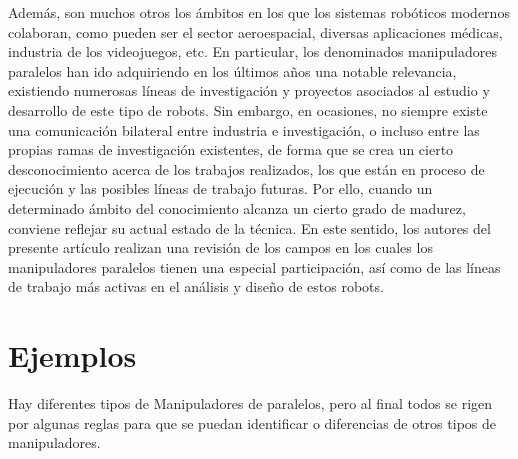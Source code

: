 \documentclass[11pt,a4paper,oldfontcommands,oneside]{memoir}
\begin{document}
Además, son muchos otros los ámbitos en los que los sistemas robóticos modernos colaboran, como pueden ser el sector aeroespacial, diversas aplicaciones médicas, industria de los videojuegos, etc. En particular, los denominados manipuladores paralelos han ido adquiriendo en los últimos años una notable relevancia, existiendo numerosas líneas de investigación y proyectos asociados al estudio y desarrollo de este tipo de robots. Sin embargo, en ocasiones, no siempre existe una comunicación bilateral entre industria e investigación, o incluso entre las propias ramas de investigación existentes, de forma que se crea un cierto desconocimiento acerca de los trabajos realizados, los que están en proceso de ejecución y las posibles líneas de trabajo futuras. Por ello, cuando un determinado ámbito del conocimiento alcanza un cierto grado de madurez, conviene reflejar su actual estado de la técnica. En este sentido, los autores del presente artículo realizan una revisión de los campos en los cuales los manipuladores paralelos tienen una especial participación, así como de las líneas de trabajo más activas en el análisis y diseño de estos robots.\\

\section{Ejemplos}
Hay diferentes tipos de Manipuladores de paralelos, pero al final todos se rigen por algunas reglas para que se puedan identificar o diferencias de otros tipos de manipuladores.\\
\\
\\
\end{document}
